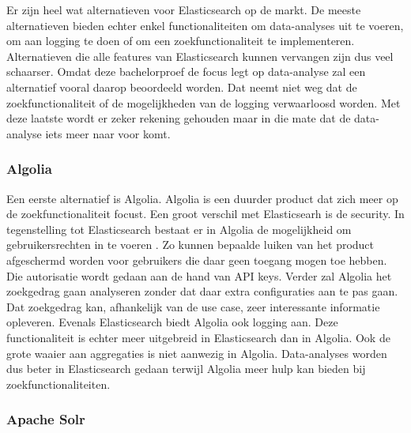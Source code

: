 Er zijn heel wat alternatieven voor Elasticsearch op de markt. De meeste alternatieven bieden echter enkel functionaliteiten om data-analyses uit te voeren, om aan logging te doen of om een zoekfunctionaliteit te implementeren. Alternatieven die alle features van Elasticsearch kunnen vervangen zijn dus veel schaarser. Omdat deze bachelorproef de focus legt op data-analyse zal een alternatief vooral daarop beoordeeld worden. Dat neemt niet weg dat de zoekfunctionaliteit of de mogelijkheden van de logging verwaarloosd worden. Met deze laatste wordt er zeker rekening gehouden maar in die mate dat de data-analyse iets meer naar voor komt.

\subsubsection{Algolia}

Een eerste alternatief is Algolia. Algolia is een duurder product dat zich meer op de zoekfunctionaliteit focust. Een groot verschil met Elasticsearh is de security. In tegenstelling tot Elasticsearch bestaat er in Algolia de mogelijkheid om gebruikersrechten in te voeren \autocite{Algolia}. Zo kunnen bepaalde luiken van het product afgeschermd worden voor gebruikers die daar geen toegang mogen toe hebben. Die autorisatie wordt gedaan aan de hand van API keys. Verder zal Algolia het zoekgedrag gaan analyseren zonder dat daar extra configuraties aan te pas gaan. Dat zoekgedrag kan, afhankelijk van de use case, zeer interessante informatie opleveren. Evenals Elasticsearch biedt Algolia ook logging aan. Deze functionaliteit is echter meer uitgebreid in Elasticsearch dan in Algolia. Ook de grote waaier aan aggregaties is niet aanwezig in Algolia. Data-analyses worden dus beter in Elasticsearch gedaan terwijl Algolia meer hulp kan bieden bij zoekfunctionaliteiten.

\subsubsection{Apache Solr}

